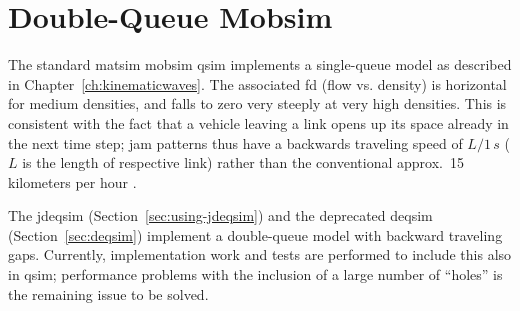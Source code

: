 \section{Double-Queue Mobsim}
\label{sec:researchavenues-double-queue-mobsim}
The standard \gls{matsim} \gls{mobsim} \gls{qsim} implements a single-queue model as described in Chapter~\ref{ch:kinematicwaves}. The associated \gls{fd} (flow vs. density) is horizontal for medium densities, and falls to zero very steeply at very high densities. This is consistent with the fact that a vehicle leaving a link opens up its space already in the next time step; jam patterns thus have a backwards traveling speed of $L/1\,s$ ($L$ is the length of respective link) rather than the conventional approx.\ 15\,kilometers per hour \citep[see also][]{CharyparEtAl_TRB_2009}. 

The \gls{jdeqsim} (Section~\ref{sec:using-jdeqsim}) and the deprecated \gls{deqsim} (Section~\ref{sec:deqsim}) implement a double-queue model with backward traveling gaps. Currently, implementation work and tests are performed to include this also in \gls{qsim}; performance problems with the inclusion of a large number of ``holes'' is the remaining issue to be solved. 

